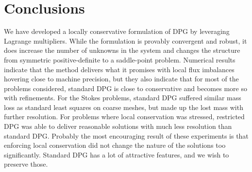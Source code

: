 \documentclass[letterpaper]{article}
\begin{document}
\section{Conclusions}
We have developed a locally conservative formulation of DPG by leveraging
Lagrange multipliers. While the formulation is provably convergent and robust, it does
increase the number of unknowns in the system and changes the structure from
symmetric positive-definite to a saddle-point problem. Numerical results
indicate that the method delivers what it promises with local flux imbalances
hovering close to machine precision, but they also indicate that for most of the
problems considered, standard DPG is close to conservative and becomes more so
with refinements. For the Stokes problems, standard DPG suffered similar mass
loss as standard least squares on coarse meshes, but made up the lost mass with further
resolution. For problems where local conservation was stressed,
restricted DPG was able to deliver reasonable solutions with much less
resolution than standard DPG.
Probably the most encouraging result of these experiments is
that enforcing local conservation did not change the nature of the solutions
too significantly. Standard DPG has a lot of attractive features, and we wish
to preserve those.




\end{document}
